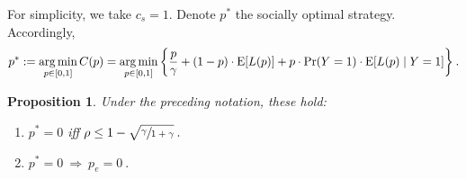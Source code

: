 \documentclass[11pt]{article}
\numberwithin{equation}{section}
\newtheorem{proposition}{Proposition}[section]
\newcommand{\e}{{\rm E}}
\DeclareMathOperator*{\argmin}{arg\,min}
\begin{document}
For simplicity, we take $c_s=1$. Denote $p^*$ the socially optimal strategy. Accordingly,
\begin{equation}
p^*:=\argmin_{p \in [0,1]}{C(p)}=\argmin_{p \in [0,1]}{\left\lbrace \frac{p}{\gamma}+ (1-p) \cdot\e[L(p)] + p \cdot \Pr(Y=1) \cdot \e[L(p) \mid Y=1]  \right\rbrace} \:.
\end{equation}

\begin{proposition}
Under the preceding notation, these hold: 
\begin{enumerate}[label=(\alph*)]
\rm \item \it $p^*=0$ iff $ \rho \leq 1- \sqrt{\sfrac{\gamma}{1+\gamma}} \:.$
\rm \item \it $p^*=0 \: \Rightarrow \: p_e=0 \:.$
\end{enumerate}
\end{proposition}
\end{document}
